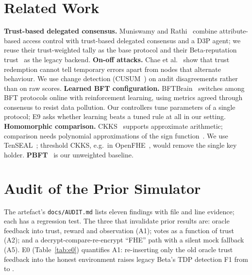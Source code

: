 \documentclass[conference]{IEEEtran}
\begin{document}
\section{Related Work}
\textbf{Trust-based delegated consensus.} Muniswamy and Rathi~\cite{muniswamy2025trust} combine attribute-based
access control with trust-based delegated consensus and a D3P agent; we reuse their trust-weighted tally
as the base protocol and their Beta-reputation trust~\cite{josang2002beta} as the legacy backend.
\textbf{On-off attacks.} Chae et al.~\cite{chae2015onoff} show that trust redemption cannot tell temporary
errors apart from nodes that alternate behaviour. We use change detection (CUSUM~\cite{page1954cusum}) on
audit disagreements rather than on raw scores.
\textbf{Learned BFT configuration.} BFTBrain~\cite{wu2025bftbrain} switches among BFT protocols online with
reinforcement learning, using metrics agreed through consensus to resist data pollution. Our controllers
tune parameters of a single protocol; E9 asks whether learning beats a tuned rule at all in our setting.
\textbf{Homomorphic comparison.} CKKS~\cite{cheon2017ckks} supports approximate arithmetic; comparison
needs polynomial approximations of the sign function~\cite{cheon2020comparison}. We use TenSEAL~\cite{benaissa2021tenseal};
threshold CKKS, e.g.\ in OpenFHE~\cite{albadawi2022openfhe}, would remove the single key holder.
\textbf{PBFT}~\cite{castro1999pbft} is our unweighted baseline.

\section{Audit of the Prior Simulator}\label{sec:audit}
The artefact's \texttt{docs/AUDIT.md} lists eleven findings with file and line
evidence; each has a regression test. The three that invalidate prior results are:
oracle feedback into trust, reward and observation (A1); votes as a function of trust (A2); and a
decrypt-compare-re-encrypt ``FHE'' path with a silent mock fallback (A5).
E0 (Table~\ref{tab:e0}) quantifies A1: re-inserting only the old oracle trust feedback into the honest
environment raises legacy Beta's TDP detection F1 from \EzeroHonestTdp{} to \EzeroOracleTdp{}.

\end{document}
